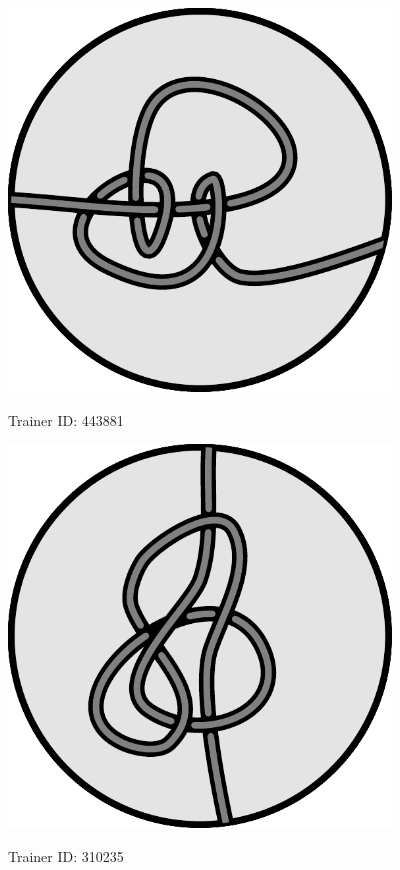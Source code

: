   \begin{center}
%
    \includegraphics[width=4in]{assets/knot2.pdf}

    \Huge Trainer ID: 443881 
%
%
%
  \end{center}

  \begin{center}
    \includegraphics[width=4in]{assets/knot3.pdf}

    \Huge Trainer ID: 310235 
%
%
%
  \end{center}

